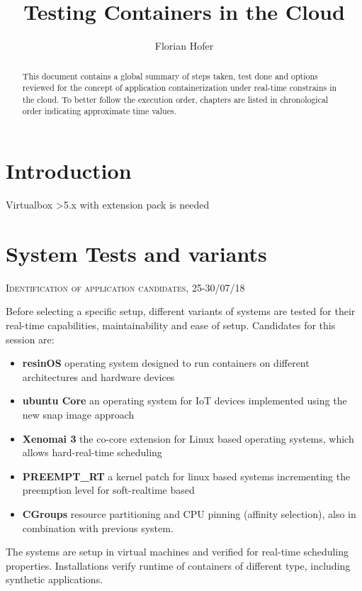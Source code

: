 \documentclass[]{scrartcl}
\title{Testing Containers in the Cloud}
\author{Florian Hofer}
\date{}
\begin{document}
\maketitle

\begin{abstract}
	This document contains a global summary of steps taken, test done and options reviewed for the concept of application containerization under real-time constrains in the cloud. To better follow the execution order, chapters are listed in chronological order indicating approximate time values.
\end{abstract}

\section{Introduction}



Virtualbox >5.x with extension pack is needed

\section{System Tests and variants}

{\small\textsc{Identification of application candidates, 25-30/07/18} \bigskip}

Before selecting a specific setup, different variants of systems are tested for their real-time capabilities, maintainability and ease of setup. Candidates for this session are:

\begin{itemize}
	\item \textbf{resinOS} operating system designed to run containers on different architectures and hardware devices
	\item \textbf{ubuntu Core} an operating system for IoT devices implemented using the new snap image approach
	\item \textbf{Xenomai 3} the co-core extension for Linux based operating systems, which allows hard-real-time scheduling
	\item \textbf{PREEMPT\_RT} a kernel patch for linux based systems incrementing the preemption level for soft-realtime based
	\item \textbf{CGroups} resource partitioning and CPU pinning (affinity selection), also in combination with previous system.
\end{itemize}

The systems are setup in virtual machines and verified for real-time scheduling properties. Installations verify runtime of containers of different type, including synthetic applications.
\end{document}
